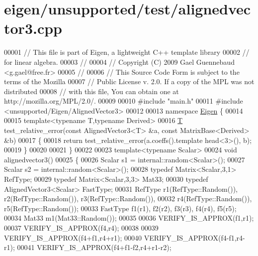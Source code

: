 \hypertarget{eigen_2unsupported_2test_2alignedvector3_8cpp_source}{}\section{eigen/unsupported/test/alignedvector3.cpp}
\label{eigen_2unsupported_2test_2alignedvector3_8cpp_source}

\begin{DoxyCode}
00001 \textcolor{comment}{// This file is part of Eigen, a lightweight C++ template library}
00002 \textcolor{comment}{// for linear algebra.}
00003 \textcolor{comment}{//}
00004 \textcolor{comment}{// Copyright (C) 2009 Gael Guennebaud <g.gael@free.fr>}
00005 \textcolor{comment}{//}
00006 \textcolor{comment}{// This Source Code Form is subject to the terms of the Mozilla}
00007 \textcolor{comment}{// Public License v. 2.0. If a copy of the MPL was not distributed}
00008 \textcolor{comment}{// with this file, You can obtain one at http://mozilla.org/MPL/2.0/.}
00009 
00010 \textcolor{preprocessor}{#include "main.h"}
00011 \textcolor{preprocessor}{#include <unsupported/Eigen/AlignedVector3>}
00012 
00013 \textcolor{keyword}{namespace }\hyperlink{namespace_eigen}{Eigen} \{
00014 
00015 \textcolor{keyword}{template}<\textcolor{keyword}{typename} T,\textcolor{keyword}{typename} Derived>
00016 \hyperlink{group___sparse_core___module_class_eigen_1_1_triplet}{T} test\_relative\_error(\textcolor{keyword}{const} AlignedVector3<T> &a, \textcolor{keyword}{const} MatrixBase<Derived> &b)
00017 \{
00018   \textcolor{keywordflow}{return} test\_relative\_error(a.coeffs().template head<3>(), b);
00019 \}
00020 
00021 \}
00022 
00023 \textcolor{keyword}{template}<\textcolor{keyword}{typename} Scalar>
00024 \textcolor{keywordtype}{void} alignedvector3()
00025 \{
00026   Scalar s1 = internal::random<Scalar>();
00027   Scalar s2 = internal::random<Scalar>();
00028   \textcolor{keyword}{typedef} Matrix<Scalar,3,1> RefType;
00029   \textcolor{keyword}{typedef} Matrix<Scalar,3,3> Mat33;
00030   \textcolor{keyword}{typedef} AlignedVector3<Scalar> FastType;
00031   RefType  r1(RefType::Random()), r2(RefType::Random()), r3(RefType::Random()),
00032            r4(RefType::Random()), r5(RefType::Random());
00033   FastType f1(r1), f2(r2), f3(r3), f4(r4), f5(r5);
00034   Mat33 m1(Mat33::Random());
00035   
00036   VERIFY\_IS\_APPROX(f1,r1);
00037   VERIFY\_IS\_APPROX(f4,r4);
00038 
00039   VERIFY\_IS\_APPROX(f4+f1,r4+r1);
00040   VERIFY\_IS\_APPROX(f4-f1,r4-r1);
00041   VERIFY\_IS\_APPROX(f4+f1-f2,r4+r1-r2);

\end{DoxyCode}
